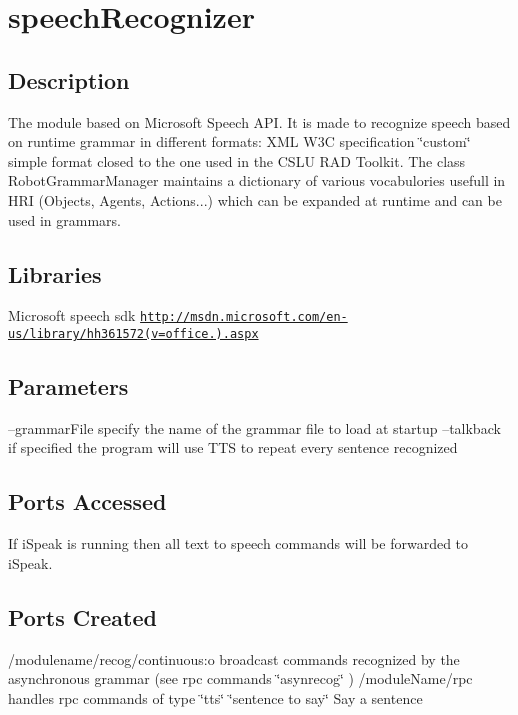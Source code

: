 \section{speech\+Recognizer}
\label{group__icub__speechRecognizer}
\hypertarget{group__windows-tts_intro_sec}{}\subsection{Description}\label{group__windows-tts_intro_sec}
The module based on Microsoft Speech A\+P\+I. It is made to recognize speech based on runtime grammar in different formats\+: X\+M\+L W3\+C specification \char`\"{}custom\char`\"{} simple format closed to the one used in the C\+S\+L\+U R\+A\+D Toolkit. The class Robot\+Grammar\+Manager maintains a dictionary of various vocabulories usefull in H\+R\+I (Objects, Agents, Actions...) which can be expanded at runtime and can be used in grammars.\hypertarget{group__windows-tts_lib_sec}{}\subsection{Libraries}\label{group__windows-tts_lib_sec}
Microsoft speech sdk \href{http://msdn.microsoft.com/en-us/library/hh361572(v=office.14).aspx}{\tt http\+://msdn.\+microsoft.\+com/en-\/us/library/hh361572(v=office.).\+aspx}\hypertarget{group__windows-tts_parameters_sec}{}\subsection{Parameters}\label{group__windows-tts_parameters_sec}
--grammar\+File specify the name of the grammar file to load at startup --talkback if specified the program will use T\+T\+S to repeat every sentence recognized\hypertarget{group__windows-tts_portsa_sec}{}\subsection{Ports Accessed}\label{group__windows-tts_portsa_sec}
If i\+Speak is running then all text to speech commands will be forwarded to i\+Speak.\hypertarget{group__windows-tts_portsc_sec}{}\subsection{Ports Created}\label{group__windows-tts_portsc_sec}
/modulename/recog/continuous\+:o broadcast commands recognized by the asynchronous grammar (see rpc commands \char`\"{}asynrecog\char`\"{} ) /module\+Name/rpc handles rpc commands of type \char`\"{}tts\char`\"{} \char`\"{}sentence to say\char`\"{} Say a sentence

